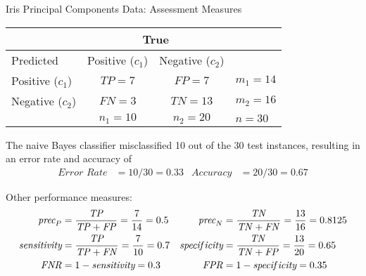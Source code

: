 \begin{frame}{Iris Principal Components Data: Assessment Measures}
\renewcommand{\arraystretch}{1.1}
\begin{center}
\begin{tabular}{|l||c|c||l|}
    \hline
    & \multicolumn{2}{c||}{True} & \\
    \hline
     Predicted & Positive ($c_1$) & Negative ($c_2$) & \\
    \hline\hline
  Positive ($c_1$)&   $\mathit{TP}=7$  & $\mathit{FP}=7$ & $m_1 = 14$\\
  Negative  ($c_2$)&   $\mathit{FN}=3$ & $\mathit{TN}=13$ & $m_2 = 16$\\
  \hline
  & $n_1 = 10$ & $n_2 = 20$ & $n=30$\\
  \hline
  \end{tabular}%
\end{center}
\small
The
  naive Bayes classif\/{i}er misclassif\/{i}ed 10 out of the 30 test instances,
  resulting in an error rate and accuracy of
  \begin{align*}
    \textit{Error\ Rate} &= {10/30} = 0.33 & 
    \textit{Accuracy} & = {20/30} = 0.67
  \end{align*}
  
  Other performance measures:
  \begin{align*}
    \textit{prec}_P & = {\mathit{TP} \over \mathit{TP}+\mathit{FP}} = {7
	\over 14} = 0.5 & 
    \textit{prec}_N & = {\mathit{TN} \over \mathit{TN}+\mathit{FN}} = {13 \over 16} = 0.8125\\
    \textit{sensitivity}
    & = {\mathit{TP} \over \mathit{TP}+\mathit{FN}} = {7 \over 10} = 0.7 &
    \textit{specif\/{i}city}
    & = {\mathit{TN} \over \mathit{TN}+\mathit{FP}} = {13 \over 20} = 0.65\\
    \mathit{FNR} & = 1 - \textit{sensitivity} = 0.3 & 
    \mathit{FPR} & = 1 - \textit{specif\/{i}city} = 0.35
  \end{align*}

\end{frame}




